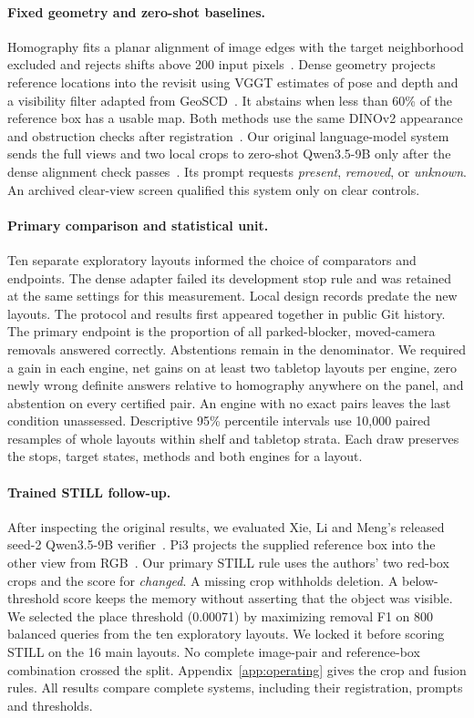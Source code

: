 \documentclass{article}
\begin{document}
\paragraph{Fixed geometry and zero-shot baselines.}
Homography fits a planar alignment of image edges with the target neighborhood excluded and rejects shifts above 200 input pixels~\citep{ecc}. Dense geometry projects reference locations into the revisit using VGGT estimates of pose and depth and a visibility filter adapted from GeoSCD~\citep{vggt,geoscd}. It abstains when less than 60\% of the reference box has a usable map. Both methods use the same DINOv2 appearance and obstruction checks after registration~\citep{dinov2,yoloworld}.
Our original language-model system sends the full views and two local crops to zero-shot Qwen3.5-9B only after the dense alignment check passes~\citep{qwen,qwen-weights}. Its prompt requests \emph{present}, \emph{removed}, or \emph{unknown}. An archived clear-view screen qualified this system only on clear controls.

\paragraph{Primary comparison and statistical unit.}
Ten separate exploratory layouts informed the choice of comparators and endpoints. The dense adapter failed its development stop rule and was retained at the same settings for this measurement. Local design records predate the new layouts. The protocol and results first appeared together in public Git history.
The primary endpoint is the proportion of all parked-blocker, moved-camera removals answered correctly. Abstentions remain in the denominator. We required a gain in each engine, net gains on at least two tabletop layouts per engine, zero newly wrong definite answers relative to homography anywhere on the panel, and abstention on every certified pair. An engine with no exact pairs leaves the last condition unassessed.
Descriptive 95\% percentile intervals use 10,000 paired resamples of whole layouts within shelf and tabletop strata. Each draw preserves the stops, target states, methods and both engines for a layout.

\paragraph{Trained STILL follow-up.}
After inspecting the original results, we evaluated Xie, Li and Meng's released seed-2 Qwen3.5-9B verifier~\citep{still,still-weights}. Pi3 projects the supplied reference box into the other view from RGB~\citep{pi3}. Our primary STILL rule uses the authors' two red-box crops and the score for \emph{changed}. A missing crop withholds deletion. A below-threshold score keeps the memory without asserting that the object was visible.
We selected the place threshold (0.00071) by maximizing removal F1 on 800 balanced queries from the ten exploratory layouts. We locked it before scoring STILL on the 16 main layouts. No complete image-pair and reference-box combination crossed the split.
Appendix~\ref{app:operating} gives the crop and fusion rules. All results compare complete systems, including their registration, prompts and thresholds.
\end{document}
